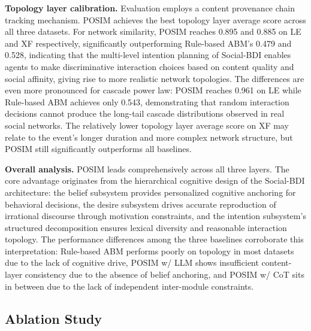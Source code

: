 \documentclass[a4paper,fleqn]{cas-dc}
\begin{document}
\textbf{Topology layer calibration.} Evaluation employs a content provenance chain tracking mechanism. POSIM achieves the best topology layer average score across all three datasets. For network similarity, POSIM reaches 0.895 and 0.885 on LE and XF respectively, significantly outperforming Rule-based ABM's 0.479 and 0.528, indicating that the multi-level intention planning of Social-BDI enables agents to make discriminative interaction choices based on content quality and social affinity, giving rise to more realistic network topologies. The differences are even more pronounced for cascade power law: POSIM reaches 0.961 on LE while Rule-based ABM achieves only 0.543, demonstrating that random interaction decisions cannot produce the long-tail cascade distributions observed in real social networks. The relatively lower topology layer average score on XF may relate to the event's longer duration and more complex network structure, but POSIM still significantly outperforms all baselines.

\textbf{Overall analysis.} POSIM leads comprehensively across all three layers. The core advantage originates from the hierarchical cognitive design of the Social-BDI architecture: the belief subsystem provides personalized cognitive anchoring for behavioral decisions, the desire subsystem drives accurate reproduction of irrational discourse through motivation constraints, and the intention subsystem's structured decomposition ensures lexical diversity and reasonable interaction topology. The performance differences among the three baselines corroborate this interpretation: Rule-based ABM performs poorly on topology in most datasets due to the lack of cognitive drive, POSIM w/ LLM shows insufficient content-layer consistency due to the absence of belief anchoring, and POSIM w/ CoT sits in between due to the lack of independent inter-module constraints.

\vspace{6pt}
\subsection{Ablation Study}
\end{document}
